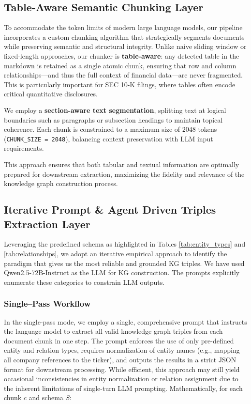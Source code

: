 \subsection{Table-Aware Semantic Chunking Layer}

To accommodate the token limits of modern large language models, our pipeline incorporates a custom chunking algorithm that strategically segments documents while preserving semantic and structural integrity. Unlike naive sliding window or fixed-length approaches, our chunker is \textbf{table-aware}: any detected table in the markdown is retained as a single atomic chunk, ensuring that row and column relationships—and thus the full context of financial data—are never fragmented. This is particularly important for SEC 10-K filings, where tables often encode critical quantitative disclosures.

We employ a \textbf{section-aware text segmentation}, splitting text at logical boundaries such as paragraphs or subsection headings to maintain topical coherence. Each chunk is constrained to a maximum size of 2048 tokens (\texttt{CHUNK\_SIZE = 2048}), balancing context preservation with LLM input requirements.

This approach ensures that both tabular and textual information are optimally prepared for downstream extraction, maximizing the fidelity and relevance of the knowledge graph construction process.

\subsection{Iterative Prompt \& Agent Driven Triples Extraction Layer}
Leveraging the predefined schema as highlighted in Tables \ref{tab:entity_types} and \ref{tab:relationships}, we adopt an iterative empirical approach to identify the paradigm that gives us the most reliable and grounded KG triples. We have used Qwen2.5-72B-Instruct as the LLM for KG construction.
The prompts explicitly enumerate these categories to constrain LLM outputs.

\subsubsection{Single–Pass Workflow}
In the single-pass mode, we employ a single, comprehensive prompt that instructs the language model to extract all valid knowledge graph triples from each document chunk in one step. The prompt enforces the use of only pre-defined entity and relation types, requires normalization of entity names (e.g., mapping all company references to the ticker), and outputs the results in a strict JSON format for downstream processing. While efficient, this approach may still yield occasional inconsistencies in entity normalization or relation assignment due to the inherent limitations of single-turn LLM prompting.
Mathematically, for each chunk $c$ and schema $S$:

